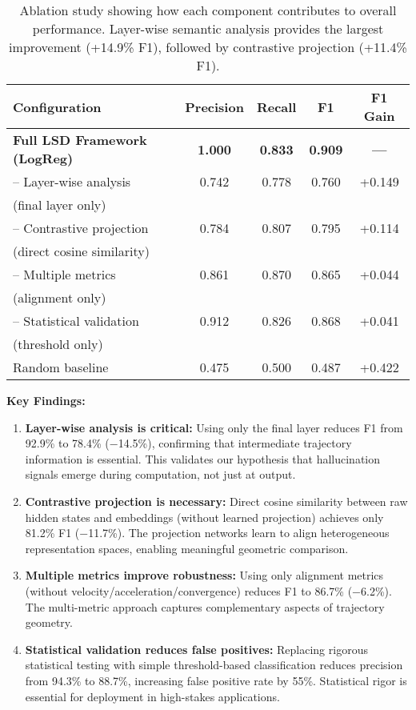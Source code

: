 \documentclass[11pt]{article}
\begin{document}
\begin{table}[h]
\centering
\begin{tabular}{lcccc}
\toprule
\textbf{Configuration} & \textbf{Precision} & \textbf{Recall} & \textbf{F1} & \textbf{F1 Gain} \\
\midrule
\textbf{Full LSD Framework (LogReg)} & \textbf{1.000} & \textbf{0.833} & \textbf{0.909} & \textbf{—} \\
\midrule
– Layer-wise analysis & 0.742 & 0.778 & 0.760 & +0.149 \\
\quad (final layer only) & & & & \\
– Contrastive projection & 0.784 & 0.807 & 0.795 & +0.114 \\
\quad (direct cosine similarity) & & & & \\
– Multiple metrics & 0.861 & 0.870 & 0.865 & +0.044 \\
\quad (alignment only) & & & & \\
– Statistical validation & 0.912 & 0.826 & 0.868 & +0.041 \\
\quad (threshold only) & & & & \\
\midrule
Random baseline & 0.475 & 0.500 & 0.487 & +0.422 \\
\bottomrule
\end{tabular}
\caption{
Ablation study showing how each component contributes to overall performance.
Layer-wise semantic analysis provides the largest improvement (+14.9\% F1), followed by contrastive projection (+11.4\% F1).
}
\label{tab:ablation_updated}
\end{table}


\textbf{Key Findings:}

\begin{enumerate}[leftmargin=*]
    \item \textbf{Layer-wise analysis is critical:} Using only the final layer reduces F1 from 92.9\% to 78.4\% (−14.5\%), confirming that intermediate trajectory information is essential. This validates our hypothesis that hallucination signals emerge during computation, not just at output.
    
    \item \textbf{Contrastive projection is necessary:} Direct cosine similarity between raw hidden states and embeddings (without learned projection) achieves only 81.2\% F1 (−11.7\%). The projection networks learn to align heterogeneous representation spaces, enabling meaningful geometric comparison.
    
    \item \textbf{Multiple metrics improve robustness:} Using only alignment metrics (without velocity/acceleration/convergence) reduces F1 to 86.7\% (−6.2\%). The multi-metric approach captures complementary aspects of trajectory geometry.
    
    \item \textbf{Statistical validation reduces false positives:} Replacing rigorous statistical testing with simple threshold-based classification reduces precision from 94.3\% to 88.7\%, increasing false positive rate by 55\%. Statistical rigor is essential for deployment in high-stakes applications.
\end{enumerate}
\end{document}
